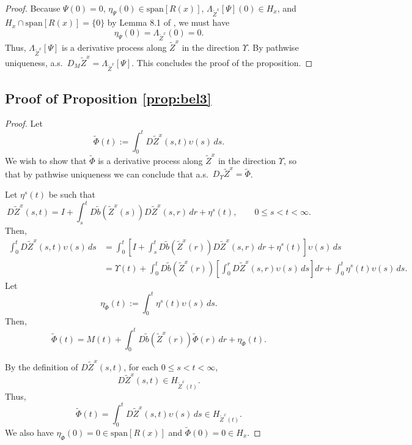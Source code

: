 \documentclass[11pt]{article}
\theoremstyle{definition}
\theoremstyle{plain}
\newcommand{\tb}{\tilde{b}}
\begin{document}
\begin{appendices}
\begin{proof}
Because \( \Psi(0) = 0 \), \( \eta_{\Psi}(0) \in \text{span}[R(x)] \), 
 \( \Lambda_{\tilde{Z}^x}[\Psi](0) \in H_x \), and $H_x \cap \text{span}[R(x)] = \{0\}$ by Lemma 8.1 of \cite{LipshutzRamanan2018},  
we must have 
\[
\eta_{\Psi}(0) = \Lambda_{\tilde{Z}^x}(0) = 0.
\]
Thus, \( \Lambda_{\tilde{Z}^x}[\Psi] \) is a derivative process along \( \tilde{Z}^x \) in the direction \( \Upsilon \).  
By pathwise uniqueness, a.s.\ \( D_M \tilde{Z}^x = \Lambda_{\tilde{Z}^x}[\Psi] \).
This concludes the proof of the proposition. 
\end{proof}

\subsection{Proof of Proposition \ref{prop:bel3}}
\begin{proof}
Let
\[
\tilde{\Phi}(t) := \int_0^t D{\tilde{Z}^x}(s,t) \upsilon(s)\,ds.
\]
We wish to show that \( \tilde{\Phi} \) is a derivative process along \( \tilde{Z}^x \) in the direction \( \Upsilon \),  
so that by pathwise uniqueness we can conclude that a.s.\ \( D_\Upsilon \tilde{Z}^x = \tilde{\Phi} \).

Let $\eta^s(t)$ be such that 
\[
D{\tilde{Z}^x}(s,t) = I + \int_s^t D\tb(\tilde{Z}^x(s)) D{\tilde{Z}^x}(s,r)\,dr + \eta^s(t), \qquad 0 \le s < t < \infty.
\]
Then,
\begin{align*}
\int_0^t D{\tilde{Z}^x}(s,t) \upsilon(s)\,ds
&= \int_0^t \left[ I + \int_s^t D\tb(\tilde{Z}^x(r)) D{\tilde{Z}^x}(s,r)\,dr + \eta^s(t) \right] \upsilon(s)\,ds \\
& = \Upsilon(t) + \int_0^t D\tb(\tilde{Z}^x(r)) \left[ \int_0^r D{\tilde{Z}^x}(s,r) \upsilon(s)\,ds \right] dr + \int_0^t \eta^s(t) \upsilon(s)\,ds.
\end{align*}
Let
\[
\eta_{\tilde{\Phi}}(t) := \int_0^t \eta^s(t) \upsilon(s)\,ds.
\]
Then,
\[
\tilde{\Phi}(t) = M(t) + \int_0^t D\tb(\tilde{Z}^x(r)) \tilde{\Phi}(r)\,dr + \eta_{\tilde{\Phi}}(t).
\]

By the definition of \( D{\tilde{Z}^x}(s,t) \), for each \( 0 \le s < t < \infty \),  
\[
D{\tilde{Z}^x}(s,t) \in H_{\tilde{Z}^x(t)}.
\]
Thus,
\[
\tilde{\Phi}(t) = \int_0^t D{\tilde{Z}^x}(s,t) \upsilon(s)\,ds \in H_{\tilde{Z}^x(t)}.
\]
We also have $\eta_{\tilde{\Phi}}(0) = 0 \in \text{span}[R(x)]$ and $\tilde{\Phi}(0) = 0 \in H_x$.


\end{proof}
\end{appendices}
\end{document}
